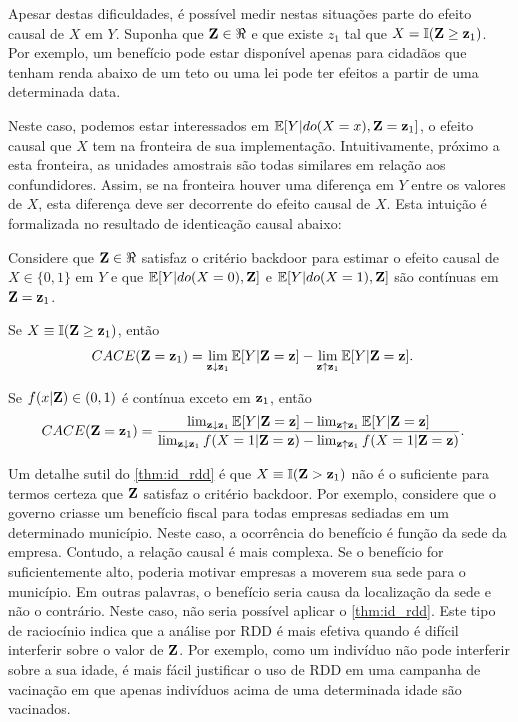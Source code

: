 Apesar destas dificuldades,
é possível medir nestas situações
parte do efeito causal de $X$ em $Y$.
Suponha que ${\mathbf{Z}} \in \Re$ e que 
existe $z_1$ tal que $X = {\mathbb I}({\mathbf{Z}} \geq {\mathbf{z}}_1)$. 
Por exemplo, um benefício pode estar disponível
apenas para cidadãos que tenham renda 
abaixo de um teto ou
uma lei pode ter efeitos
a partir de uma determinada data.

Neste caso, podemos estar interessados em
${\mathbb E}[Y|do(X=x),{\mathbf{Z}}={\mathbf{z}}_1]$, 
o efeito causal que $X$ tem na 
fronteira de sua implementação.
Intuitivamente, próximo a esta fronteira,
as unidades amostrais são todas similares 
em relação aos confundidores.
Assim, se na fronteira houver uma diferença em $Y$ entre
os valores de $X$, esta diferença 
deve ser decorrente do efeito causal de $X$.
Esta intuição é formalizada no resultado de
identicação causal abaixo:

\begin{theorem}
 \label{thm:id_rdd}
 Considere que ${\mathbf{Z}} \in \Re$ satisfaz o critério backdoor para
 estimar o efeito causal de $X \in \{0,1\}$ em $Y$ e que
 ${\mathbb E}[Y|do(X=0),{\mathbf{Z}}]$ e ${\mathbb E}[Y|do(X=1),{\mathbf{Z}}]$ são 
 contínuas em ${\mathbf{Z}}={\mathbf{z}}_1$.
 
 Se $X \equiv {\mathbb I}({\mathbf{Z}} \geq {\mathbf{z}}_1)$, então
 \begin{align*}
  {CACE}({\mathbf{Z}}={\mathbf{z}}_1)
  &= \lim_{{\mathbf{z}} \downarrow {\mathbf{z}}_1} {\mathbb E}[Y|{\mathbf{Z}} = {\mathbf{z}}] 
  - \lim_{{\mathbf{z}} \uparrow {\mathbf{z}}_1} {\mathbb E}[Y|{\mathbf{Z}} = {\mathbf{z}}].
 \end{align*}
 
 Se $f(x|{\mathbf{Z}}) \in (0,1)$ é contínua exceto em ${\mathbf{z}}_1$, então
 \begin{align*}
  {CACE}({\mathbf{Z}}={\mathbf{z}}_1)
  &= \frac{\lim_{{\mathbf{z}} \downarrow {\mathbf{z}}_1} {\mathbb E}[Y|{\mathbf{Z}} = {\mathbf{z}}] 
  - \lim_{{\mathbf{z}} \uparrow {\mathbf{z}}_1} {\mathbb E}[Y|{\mathbf{Z}} = {\mathbf{z}}]}
  {\lim_{{\mathbf{z}} \downarrow {\mathbf{z}}_1} f(X=1|{\mathbf{Z}}={\mathbf{z}}) 
  - \lim_{{\mathbf{z}} \uparrow {\mathbf{z}}_1} f(X=1|{\mathbf{Z}}={\mathbf{z}})}.
 \end{align*}
\end{theorem}

Um detalhe sutil do \cref{thm:id_rdd} é que
$X \equiv {\mathbb I}({\mathbf{Z}} > {\mathbf{z}}_1)$ não é
o suficiente para termos certeza que
${\mathbf{Z}}$ satisfaz o critério backdoor.
Por exemplo, considere que 
o governo criasse um benefício fiscal para
todas empresas sediadas em um determinado município.
Neste caso, a ocorrência do benefício é
função da sede da empresa. 
Contudo, a relação causal é mais complexa.
Se o benefício for suficientemente alto,
poderia motivar empresas a 
moverem sua sede para o município.
Em outras palavras, 
o benefício seria causa da localização da sede e não o contrário.
Neste caso, não seria possível aplicar o \cref{thm:id_rdd}.
Este tipo de raciocínio indica que a análise por RDD é
mais efetiva quando é difícil interferir sobre o valor de ${\mathbf{Z}}$.
Por exemplo, como um indivíduo não pode interferir sobre a sua idade,
é mais fácil justificar o uso de RDD em
uma campanha de vacinação em que
apenas indivíduos acima de uma determinada idade são vacinados.

